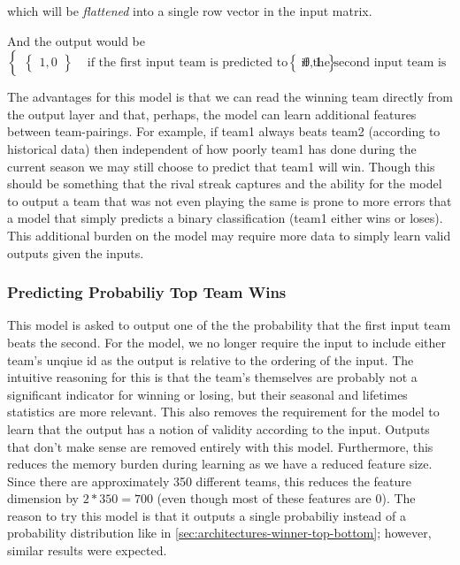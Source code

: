 \documentclass{article} %
\begin{document}
which will be \textit{flattened} into a single row vector in the input matrix.

And the output would be
\[
\begin{cases}
  \begin{Bmatrix}
    1, 0
  \end{Bmatrix} & \text{ if the first input team is predicted to win}
  \begin{Bmatrix}
    0, 1
  \end{Bmatrix} & \text{ if the second input team is predicted to win}
\end{cases}
\]


The advantages for this model is that we can read the winning team directly from the output layer and that, perhaps, the model can learn additional features between team-pairings.  For example, if team1 always beats team2 (according to historical data) then independent of how poorly team1 has done during the current season we may still choose to predict that team1 will win.  Though this should be something that the rival streak captures and the ability for the model to output a team that was not even playing the same is prone to more errors that a model that simply predicts a binary classification (team1 either wins or loses).  This additional burden on the model may require more data to simply learn valid outputs given the inputs.


\subsubsection{Predicting Probabiliy Top Team Wins}
\label{sec:architectures-winner-top-team-probability}

This model is asked to output one of the the probability that the first input team beats the second. For the model, we no longer require the input to include either team's unqiue id as the output is relative to the ordering of the input.  The intuitive reasoning for this is that the team's themselves are probably not a significant indicator for winning or losing, but their seasonal and lifetimes statistics are more relevant.  This also removes the requirement for the model to learn that the output has a notion of validity according to the input.  Outputs that don't make sense are removed entirely with this model.  Furthermore, this reduces the memory burden during learning as we have a reduced feature size.  Since there are approximately 350 different teams, this reduces the feature dimension by $2 * 350 = 700$ (even though most of these features are 0).  The reason to try this model is that it outputs a single probabiliy instead of a probability distribution like in \ref{sec:architectures-winner-top-bottom}; however, similar results were expected.
\end{document}
